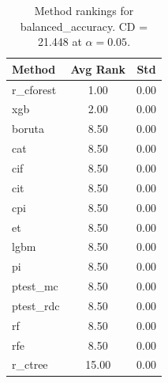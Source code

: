\begin{table}[h]
\centering
\caption{Method rankings for balanced_accuracy. CD = 21.448 at $\alpha=0.05$.}
\label{tab:ranks_balanced_accuracy}
\begin{tabular}{lcc}
\toprule
Method & Avg Rank & Std \\
\midrule
r_cforest & 1.00 & 0.00 \\
xgb & 2.00 & 0.00 \\
boruta & 8.50 & 0.00 \\
cat & 8.50 & 0.00 \\
cif & 8.50 & 0.00 \\
cit & 8.50 & 0.00 \\
cpi & 8.50 & 0.00 \\
et & 8.50 & 0.00 \\
lgbm & 8.50 & 0.00 \\
pi & 8.50 & 0.00 \\
ptest_mc & 8.50 & 0.00 \\
ptest_rdc & 8.50 & 0.00 \\
rf & 8.50 & 0.00 \\
rfe & 8.50 & 0.00 \\
r_ctree & 15.00 & 0.00 \\
\bottomrule
\end{tabular}
\end{table}